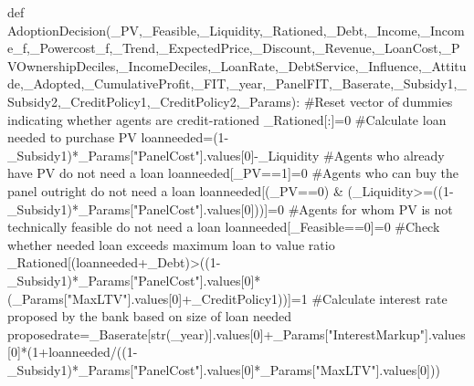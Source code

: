 \documentclass[
  letterpaper,
  DIV=11,
  numbers=noendperiod]{scrartcl}
\newenvironment{Shaded}{\begin{snugshade}}{\end{snugshade}}
\newcommand{\BuiltInTok}[1]{\textcolor[rgb]{0.00,0.23,0.31}{#1}}
\newcommand{\CommentTok}[1]{\textcolor[rgb]{0.37,0.37,0.37}{#1}}
\newcommand{\DecValTok}[1]{\textcolor[rgb]{0.68,0.00,0.00}{#1}}
\newcommand{\KeywordTok}[1]{\textcolor[rgb]{0.00,0.23,0.31}{#1}}
\newcommand{\NormalTok}[1]{\textcolor[rgb]{0.00,0.23,0.31}{#1}}
\newcommand{\OperatorTok}[1]{\textcolor[rgb]{0.37,0.37,0.37}{#1}}
\newcommand{\StringTok}[1]{\textcolor[rgb]{0.13,0.47,0.30}{#1}}
\begin{document}
\begin{Shaded}
\begin{Highlighting}[]
\KeywordTok{def}\NormalTok{ AdoptionDecision(\_PV,\_Feasible,\_Liquidity,\_Rationed,\_Debt,\_Income,\_Income\_f,\_Powercost\_f,\_Trend,\_ExpectedPrice,\_Discount,\_Revenue,\_LoanCost,\_PVOwnershipDeciles,\_IncomeDeciles,\_LoanRate,\_DebtService,\_Influence,\_Attitude,\_Adopted,\_CumulativeProfit,\_FIT,\_year,\_PanelFIT,\_Baserate,\_Subsidy1,\_Subsidy2,\_CreditPolicy1,\_CreditPolicy2,\_Params):}
    \CommentTok{\#Reset vector of dummies indicating whether agents are credit{-}rationed}
\NormalTok{    \_Rationed[:]}\OperatorTok{=}\DecValTok{0}
    \CommentTok{\#Calculate loan needed to purchase PV}
\NormalTok{    loanneeded}\OperatorTok{=}\NormalTok{(}\DecValTok{1}\OperatorTok{{-}}\NormalTok{\_Subsidy1)}\OperatorTok{*}\NormalTok{\_Params[}\StringTok{"PanelCost"}\NormalTok{].values[}\DecValTok{0}\NormalTok{]}\OperatorTok{{-}}\NormalTok{\_Liquidity}
    \CommentTok{\#Agents who already have PV do not need a loan}
\NormalTok{    loanneeded[\_PV}\OperatorTok{==}\DecValTok{1}\NormalTok{]}\OperatorTok{=}\DecValTok{0}
    \CommentTok{\#Agents who can buy the panel outright do not need a loan}
\NormalTok{    loanneeded[(\_PV}\OperatorTok{==}\DecValTok{0}\NormalTok{) }\OperatorTok{\&}\NormalTok{ (\_Liquidity}\OperatorTok{\textgreater{}=}\NormalTok{((}\DecValTok{1}\OperatorTok{{-}}\NormalTok{\_Subsidy1)}\OperatorTok{*}\NormalTok{\_Params[}\StringTok{"PanelCost"}\NormalTok{].values[}\DecValTok{0}\NormalTok{]))]}\OperatorTok{=}\DecValTok{0}
    \CommentTok{\#Agents for whom PV is not technically feasible do not need a loan}
\NormalTok{    loanneeded[\_Feasible}\OperatorTok{==}\DecValTok{0}\NormalTok{]}\OperatorTok{=}\DecValTok{0}
    \CommentTok{\#Check whether needed loan exceeds maximum loan to value ratio}
\NormalTok{    \_Rationed[(loanneeded}\OperatorTok{+}\NormalTok{\_Debt)}\OperatorTok{\textgreater{}}\NormalTok{((}\DecValTok{1}\OperatorTok{{-}}\NormalTok{\_Subsidy1)}\OperatorTok{*}\NormalTok{\_Params[}\StringTok{"PanelCost"}\NormalTok{].values[}\DecValTok{0}\NormalTok{]}\OperatorTok{*}\NormalTok{(\_Params[}\StringTok{"MaxLTV"}\NormalTok{].values[}\DecValTok{0}\NormalTok{]}\OperatorTok{+}\NormalTok{\_CreditPolicy1))]}\OperatorTok{=}\DecValTok{1}
    \CommentTok{\#Calculate interest rate proposed by the bank based on size of loan needed}
\NormalTok{    proposedrate}\OperatorTok{=}\NormalTok{\_Baserate[}\BuiltInTok{str}\NormalTok{(\_year)].values[}\DecValTok{0}\NormalTok{]}\OperatorTok{+}\NormalTok{\_Params[}\StringTok{"InterestMarkup"}\NormalTok{].values[}\DecValTok{0}\NormalTok{]}\OperatorTok{*}\NormalTok{(}\DecValTok{1}\OperatorTok{+}\NormalTok{loanneeded}\OperatorTok{/}\NormalTok{((}\DecValTok{1}\OperatorTok{{-}}\NormalTok{\_Subsidy1)}\OperatorTok{*}\NormalTok{\_Params[}\StringTok{"PanelCost"}\NormalTok{].values[}\DecValTok{0}\NormalTok{]}\OperatorTok{*}\NormalTok{\_Params[}\StringTok{"MaxLTV"}\NormalTok{].values[}\DecValTok{0}\NormalTok{]))}

\end{Highlighting}
\end{Shaded}
\end{document}
